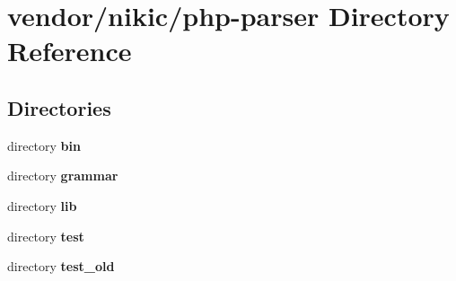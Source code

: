 \section{vendor/nikic/php-\/parser Directory Reference}
\label{dir_64189498ac3430e5f827a5e35cd7de46}
\subsection*{Directories}
\begin{DoxyCompactItemize}
\item 
directory {\bf bin}
\item 
directory {\bf grammar}
\item 
directory {\bf lib}
\item 
directory {\bf test}
\item 
directory {\bf test\+\_\+old}
\end{DoxyCompactItemize}
